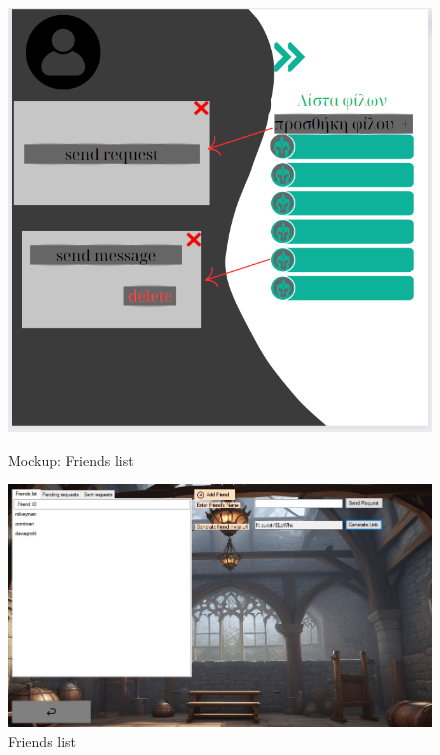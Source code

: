 \begin{figure}[h]
    \centering
    \begin{minipage}[b]{0.45\textwidth}
        \centering
    \includegraphics[width=\textwidth]{omockup4.jpg}
    \caption{Mockup: Friends list}
    \end{minipage}
    \hfill
    \begin{minipage}[b]{0.45\textwidth}
        \centering
    \includegraphics[width=\textwidth]{mockup4.jpg}
    \caption{Friends list}
    \end{minipage}
\end{figure}

